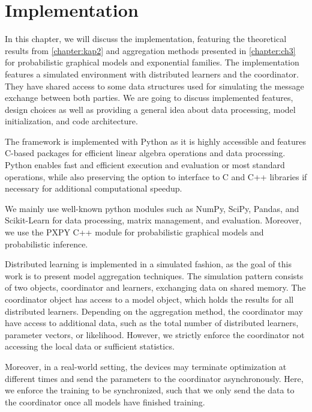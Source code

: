 
\chapter{Implementation}
\label{chapter:ch4}
In this chapter, we will discuss the implementation, featuring the theoretical results from \autoref{chapter:kap2} and aggregation methods presented in \autoref{chapter:ch3} for probabilistic graphical models and exponential families.
The implementation features a simulated environment with distributed learners and the coordinator.
They have shared access to some data structures used for simulating the message exchange between both parties.
We are going to discuss implemented features, design choices as well as providing a general idea about data processing, model initialization, and code architecture.

The framework is implemented with Python as it is highly accessible and features C-based packages for efficient linear algebra operations and data processing.
Python enables fast and efficient execution and evaluation or most standard operations, while also preserving the option to interface to C and C++ libraries if necessary for additional computational speedup.

We mainly use well-known python modules such as NumPy, SciPy, Pandas, and Scikit-Learn for data processing, matrix management, and evaluation.
Moreover, we use the PXPY C++ module for probabilistic graphical models and probabilistic inference.

Distributed learning is implemented in a simulated fashion, as the goal of this work is to present model aggregation techniques.
The simulation pattern consists of two objects, coordinator and learners, exchanging data on shared memory. 
The coordinator object has access to a model object, which holds the results for all distributed learners.
Depending on the aggregation method, the coordinator may have access to additional data, such as the total number of distributed learners, parameter vectors, or likelihood. 
However, we strictly enforce the coordinator not accessing the local data or sufficient statistics.

Moreover, in a real-world setting, the devices may terminate optimization at different times and send the parameters to the coordinator asynchronously. 
Here, we enforce the training to be synchronized, such that we only send the data to the coordinator once all models have finished training.

